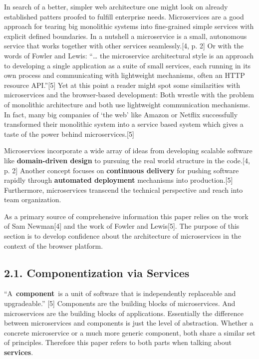 \documentclass[]{article}
\begin{document}
In search of a better, simpler web architecture one might look on
already established patters proofed to fulfill enterprise needs.
Microservices are a good approach for tearing big monolithic systems
into fine-grained simple services with explicit defined boundaries. In a
nutshell a microservice is a small, autonomous service that works
together with other services seamlessly.{[}4, p. 2{]} Or with the words
of Fowler and Lewis: ``\ldots{} the microservice architectural style is
an approach to developing a single application as a suite of small
services, each running in its own process and communicating with
lightweight mechanisms, often an HTTP resource API.''{[}5{]} Yet at this
point a reader might spot some similarities with microservices and the
browser-based development: Both wrestle with the problem of monolithic
architecture and both use lightweight communication mechanisms. In fact,
many big companies of `the web' like Amazon or Netflix successfully
transformed their monolithic system into a service based system which
gives a taste of the power behind microservices.{[}5{]}

Microservices incorporate a wide array of ideas from developing scalable
software like \textbf{domain-driven design} to pursuing the real world
structure in the code.{[}4, p. 2{]} Another concept focuses on
\textbf{continuous delivery} for pushing software rapidly through
\textbf{automated deployment} mechanisms into production.{[}5{]}
Furthermore, microservices transcend the technical perspective and reach
into team organization.

As a primary source of comprehensive information this paper relies on
the work of Sam Newman{[}4{]} and the work of Fowler and Lewis{[}5{]}.
The purpose of this section is to develop confidence about the
architecture of microservices in the context of the browser platform.

\subsection{2.1. Componentization via
Services}\label{componentization-via-services}

``A~\textbf{component}~is a unit of software that is independently
replaceable and upgradeable.'' {[}5{]} Components are the building
blocks of microservices. And microservices are the building blocks of
applications. Essentially the difference between microservices and
components is just the level of abstraction. Whether a concrete
microservice or a much more generic component, both share a similar set
of principles. Therefore this paper refers to both parts when talking
about \textbf{services}.
\end{document}
